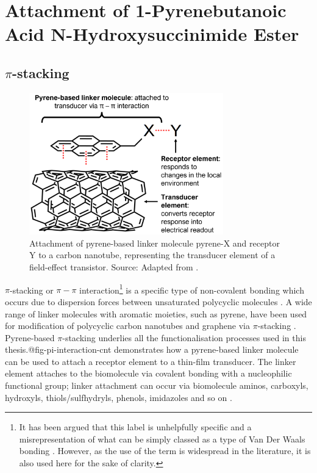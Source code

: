 \documentclass[
  a4paper,
]{scrbook}
\begin{document}
\hypertarget{sec-PBASE}{%
\section{Attachment of 1-Pyrenebutanoic Acid N-Hydroxysuccinimide
Ester}\label{sec-PBASE}}

\hypertarget{sec-pi-stacking}{%
\subsection{\texorpdfstring{\(\pi\)-stacking}{\textbackslash pi-stacking}}\label{sec-pi-stacking}}

\begin{figure}

{\centering \includegraphics[width=0.75\textwidth,height=\textheight]{figures/ch3/pyrene-cnt.png}

}

\caption{\label{fig-pi-interaction-cnt}Attachment of pyrene-based linker
molecule pyrene-X and receptor Y to a carbon nanotube, representing the
transducer element of a field-effect transistor. Source: Adapted from
\autocite{Carbonnanotube}.}

\end{figure}

\(\pi\)-stacking or \(\pi-\pi\) interaction\footnote{It has been argued
  that this label is unhelpfully specific and a misrepresentation of
  what can be simply classed as a type of Van Der Waals bonding
  \autocite{Martinez2012,Perez2015}. However, as the use of the term is
  widespread in the literature, it is also used here for the sake of
  clarity.} is a specific type of non-covalent bonding which occurs due
to dispersion forces between unsaturated polycyclic molecules
\autocite{Perez2015}. A wide range of linker molecules with aromatic
moieties, such as pyrene, have been used for modification of polycyclic
carbon nanotubes and graphene via \(\pi\)-stacking
\autocite{Hermanson2013-16,Perez2015,Zhou2019,Mishyn2022}. Pyrene-based
\(\pi\)-stacking underlies all the functionalisation processes used in
this thesis.@fig-pi-interaction-cnt demonstrates how a pyrene-based
linker molecule can be used to attach a receptor element to a thin-film
transducer. The linker element attaches to the biomolecule via covalent
bonding with a nucleophilic functional group; linker attachment can
occur via biomolecule aminos, carboxyls, hydroxyls, thiols/sulfhydryls,
phenols, imidazoles and so on \autocite{Fruh2011,Dung2018}.
\end{document}
